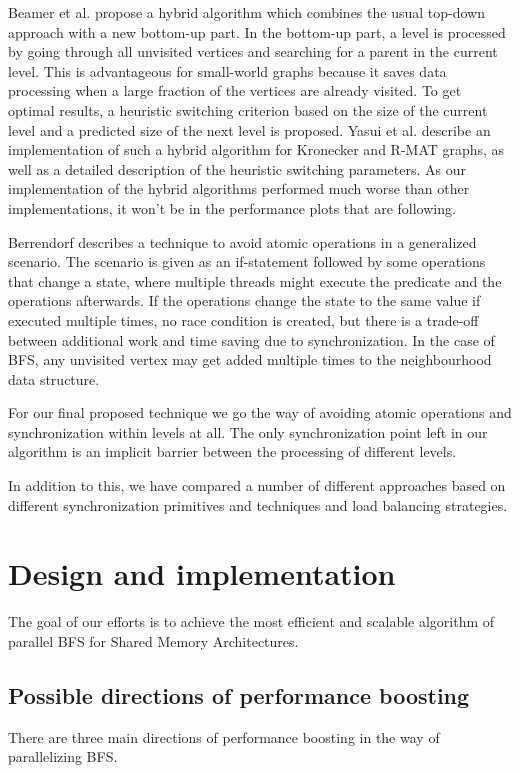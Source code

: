 \documentclass[letterpaper]{article}
\begin{document}
		Beamer et al.\cite{beamer2011searching} propose a hybrid algorithm which combines the usual top-down approach with a new bottom-up part. 
		In the bottom-up part, a level is processed by going through all unvisited vertices and searching for a parent in the current level. 
		This is advantageous for small-world graphs because it saves data processing when a large fraction of the vertices are already visited. 
		To get optimal results, a heuristic switching criterion based on the size of the current level and a predicted size of the next level is proposed. 
		Yasui et al.\cite{6691600} describe an implementation of such a hybrid algorithm for Kronecker and R-MAT graphs, as well as a detailed description of the heuristic switching parameters.
		As our implementation of the hybrid algorithms performed much worse than other implementations, it won't be in the performance plots that are following.
	
		Berrendorf\cite{Berrendorf:14} describes a technique to avoid atomic operations in a generalized scenario. 
		The scenario is given as an if-statement followed by some operations that change a state, where multiple threads might execute the predicate and the operations afterwards. 
		If the operations change the state to the same value if executed multiple times, no race condition is created, but there is a trade-off between additional work and time saving due to synchronization.
		In the case of BFS, any unvisited vertex may get added multiple times to the neighbourhood data structure.		
	
		For our final proposed technique we go the way of avoiding atomic operations and synchronization within levels at all.
		The only synchronization point left in our algorithm is an implicit barrier between the processing of different levels.
		
		In addition to this, we have compared a number of different approaches based on different synchronization primitives and techniques and load balancing strategies. %
	
	
	\section{Design and implementation}\label{sec:deim} %
		The goal of our efforts is to achieve the most efficient and scalable algorithm of parallel BFS for Shared Memory Architectures. 

		\subsection{Possible directions of performance boosting}
			There are three main directions of performance boosting in the way of parallelizing BFS.
			
\end{document}
